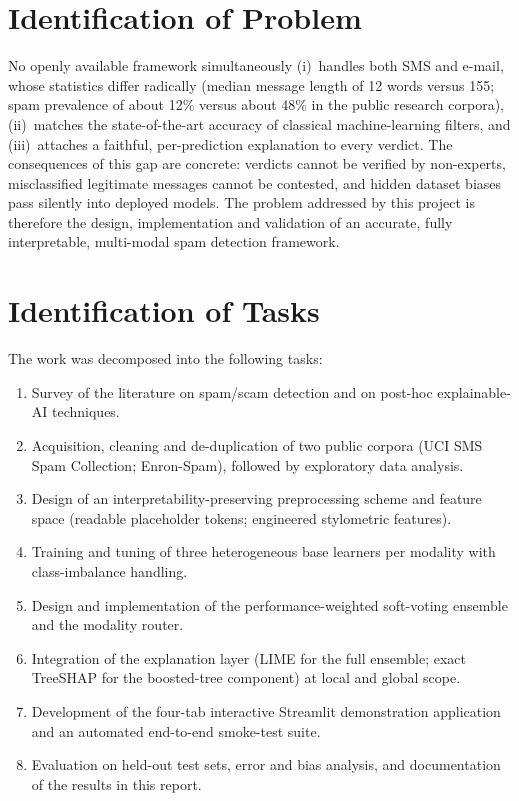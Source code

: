 \documentclass[12pt,a4paper]{report}
\begin{document}
\section{Identification of Problem}

No openly available framework simultaneously (i)~handles both SMS and e-mail,
whose statistics differ radically (median message length of 12 words versus
155; spam prevalence of about 12\% versus about 48\% in the public
research corpora), (ii)~matches the state-of-the-art accuracy of classical
machine-learning filters, and (iii)~attaches a faithful, per-prediction
explanation to every verdict. The consequences of this gap are concrete:
verdicts cannot be verified by non-experts, misclassified legitimate messages
cannot be contested, and hidden dataset biases pass silently into deployed
models. The problem addressed by this project is therefore the design,
implementation and validation of an accurate, fully interpretable,
multi-modal spam detection framework.

\section{Identification of Tasks}

The work was decomposed into the following tasks:

\begin{enumerate}
  \item Survey of the literature on spam/scam detection and on post-hoc
        explainable-AI techniques.
  \item Acquisition, cleaning and de-duplication of two public corpora (UCI
        SMS Spam Collection; Enron-Spam), followed by exploratory data
        analysis.
  \item Design of an interpretability-preserving preprocessing scheme and
        feature space (readable placeholder tokens; engineered stylometric
        features).
  \item Training and tuning of three heterogeneous base learners per modality
        with class-imbalance handling.
  \item Design and implementation of the performance-weighted soft-voting
        ensemble and the modality router.
  \item Integration of the explanation layer (LIME for the full ensemble;
        exact TreeSHAP for the boosted-tree component) at local and global
        scope.
  \item Development of the four-tab interactive Streamlit demonstration
        application and an automated end-to-end smoke-test suite.
  \item Evaluation on held-out test sets, error and bias analysis, and
        documentation of the results in this report.
\end{enumerate}
\end{document}
